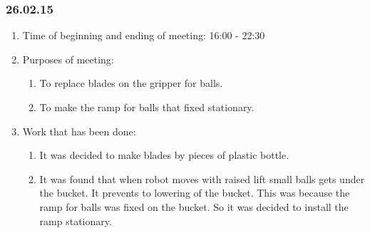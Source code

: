 \subsubsection{26.02.15}

\begin{enumerate}
	\item Time of beginning and ending of meeting:
	16:00 - 22:30
	\item Purposes of meeting:
	\begin{enumerate}
		\item To replace blades on the gripper for balls.
		
		\item To make the ramp for balls that fixed stationary.
	  
    \end{enumerate}
   
	\item Work that has been done:
	\begin{enumerate}
		 
		 \item It was decided to make blades by pieces of plastic bottle.
		 
		 \item It was found that when robot moves with raised lift small balls gets under the bucket. It prevents to lowering of the bucket. This was because the ramp for balls was fixed on the bucket. So it was decided to install the ramp stationary.
		 

\end{enumerate}
\end{enumerate}
